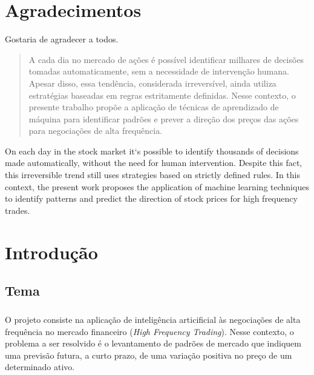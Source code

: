 \documentclass[grad,numbers]{coppe}
\begin{document}
  \frontmatter
  
  \makecatalog
  
  \dedication{A alguém cujo valor é digno desta dedicatória.}

  \chapter*{Agradecimentos}

  Gostaria de agradecer a todos.

  \begin{abstract}

  A cada dia no mercado de ações é possível identificar milhares de decisões tomadas automaticamente, sem a necessidade de intervenção humana. Apesar disso, essa tendência, considerada irreversível, ainda utiliza estratégias baseadas em regras estritamente definidas. Nesse contexto, o presente trabalho propõe a aplicação de técnicas de aprendizado de máquina para identificar padrões e prever a direção dos preços das ações para negociações de alta frequência.

  \end{abstract}

  \begin{foreignabstract}

  On each day in the stock market it`s possible to identify thousands of decisions made automatically, without the need for human intervention. Despite this fact, this irreversible trend still uses strategies based on strictly defined rules. In this context, the present work proposes the application of machine learning techniques to identify patterns and predict the direction of stock prices for high frequency trades.

  \end{foreignabstract}

  \tableofcontents
  \listoffigures
  \listoftables
  \printlosymbols
  \printloabbreviations

  \mainmatter
\chapter{Introdução}
  
  \section{Tema}
    
    \paragraph{}O projeto consiste na aplicação de inteligência articificial às negociações de alta frequência no mercado financeiro (\textit{High Frequency Trading}). Nesse contexto, o problema a ser resolvido é o levantamento de padrões de mercado que indiquem uma previsão futura, a curto prazo, de uma variação positiva no preço de um determinado ativo.
    
\end{document}
